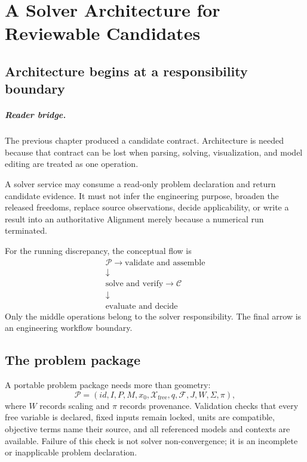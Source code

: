 \chapter{A Solver Architecture for Reviewable Candidates}

\section{Architecture begins at a responsibility boundary}

\paragraph{Reader bridge.}
The previous chapter produced a candidate contract. Architecture is needed
because that contract can be lost when parsing, solving, visualization, and
model editing are treated as one operation.

A solver service may consume a read-only problem declaration and return
candidate evidence. It must not infer the engineering purpose, broaden the
released freedoms, replace source observations, decide applicability, or
write a result into an authoritative Alignment merely because a numerical run
terminated.

For the running discrepancy, the conceptual flow is
\[
\begin{array}{c}
\boxed{\mathcal P}\longrightarrow\boxed{\text{validate and assemble}}\\[0.4em]
\downarrow\\[-0.2em]
\boxed{\text{solve and verify}}\longrightarrow\boxed{\mathcal C}\\[0.4em]
\downarrow\\[-0.2em]
\boxed{\text{evaluate and decide}}
\end{array}
\]
Only the middle operations belong to the solver responsibility. The final
arrow is an engineering workflow boundary.

\section{The problem package}

A portable problem package needs more than geometry:
\[
\mathcal P=
(id,I,P,M,x_0,\mathcal X_{\mathrm{free}},q,\mathcal F,
J,W,\Sigma,\pi),
\]
where \(W\) records scaling and \(\pi\) records provenance. Validation checks
that every free variable is declared, fixed inputs remain locked, units are
compatible, objective terms name their source, and all referenced models and
contexts are available. Failure of this check is not solver non-convergence;
it is an incomplete or inapplicable problem declaration.

